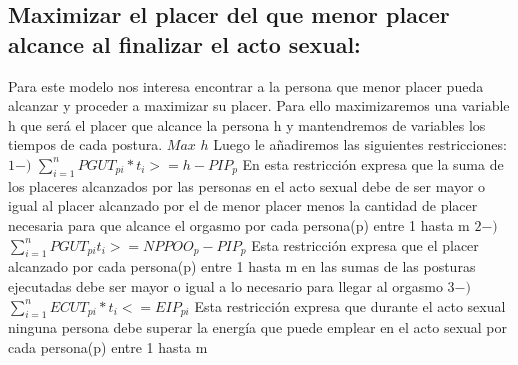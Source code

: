 \documentclass{llncs}
\begin{document}
\subsection{Maximizar el placer del que menor placer alcance al finalizar el acto sexual:}
Para este modelo nos interesa encontrar a la persona que menor placer pueda alcanzar y proceder a maximizar su placer. Para ello maximizaremos una variable h que será el placer que alcance la persona h y mantendremos de variables los tiempos de cada postura.
\newline
\newline
$Max$ $h$
\newline
\newline
Luego le añadiremos las siguientes restricciones:
\newline
\newline
$1-)$ $\sum_{i=1}^{n} PGUT_{pi}*t_{i} >= h - PIP_{p}$
\newline
\newline
En esta restricción expresa que la suma de los placeres alcanzados por las personas en el acto sexual debe de ser mayor o igual al placer alcanzado por el de menor placer menos la cantidad de placer necesaria para que alcance el orgasmo por cada persona(p) entre 1 hasta m
\newline
\newline
$2-)$ $\sum_{i=1}^{n} PGUT_{pi}t_{i} >= NPPOO_{p} - PIP_{p}$
\newline
\newline
Esta restricción expresa que el placer alcanzado por cada persona(p) entre 1 hasta m en las sumas de las posturas ejecutadas debe ser mayor o igual a lo necesario para llegar al orgasmo
\newline
\newline
$3-)$ $\sum_{i=1}^{n} ECUT_{pi}*t_{i} <= EIP_{pi}$
\newline
\newline
Esta restricción expresa que durante el acto sexual ninguna persona debe superar la energía que puede emplear en el acto sexual por cada persona(p) entre 1 hasta m
\end{document}
